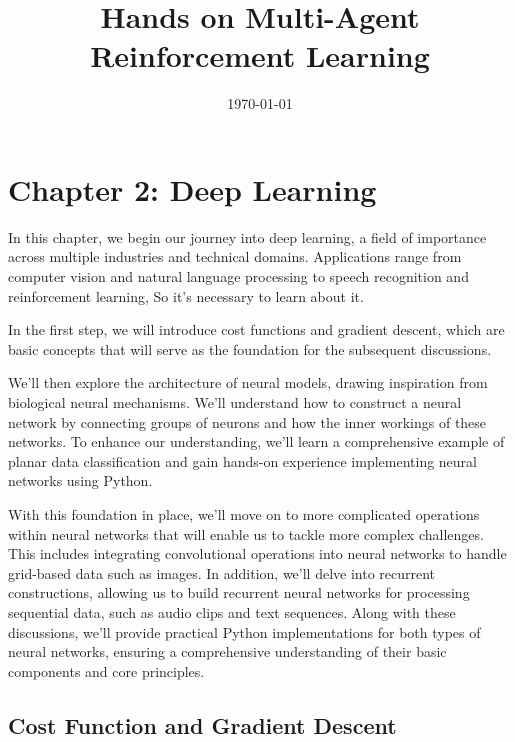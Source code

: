 \documentclass{article}
\begin{document}
	
	\title{Hands on Multi-Agent Reinforcement Learning}
	
	\date{\today}
	
	\maketitle
	
	\tableofcontents  %
	\clearpage  %
    
	\newpage
	\section{Chapter 2: Deep Learning }
    \setcounter{section}{2}

    In this chapter, we begin our journey into deep learning, a field of importance across multiple industries and technical domains. Applications range from computer vision and natural language processing to speech recognition and reinforcement learning, So it's necessary to learn about it.

In the first step, we will introduce cost functions and gradient descent, which are basic concepts that will serve as the foundation for the subsequent discussions.

We'll then explore the architecture of neural models, drawing inspiration from biological neural mechanisms. We'll understand how to construct a neural network by connecting groups of neurons and how the inner workings of these networks. To enhance our understanding, we'll learn a comprehensive example of planar data classification and gain hands-on experience implementing neural networks using Python.

With this foundation in place, we'll move on to more complicated operations within neural networks that will enable us to tackle more complex challenges. This includes integrating convolutional operations into neural networks to handle grid-based data such as images. In addition, we'll delve into recurrent constructions, allowing us to build recurrent neural networks for processing sequential data, such as audio clips and text sequences. Along with these discussions, we'll provide practical Python implementations for both types of neural networks, ensuring a comprehensive understanding of their basic components and core principles.


    \newpage
	\subsection{Cost Function and Gradient Descent}
\end{document}
